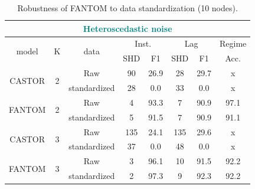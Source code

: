 \begin{table}[H]
\centering
\caption{Robustness of FANTOM to data standardization (10 nodes). }
\begin{tabular}{@{}cccccccc@{}}
\toprule
\multicolumn{8}{c}{\textcolor{teal}{Heteroscedastic noise}}                                                                                                                                                                       \\ \midrule
\multicolumn{1}{c|}{\multirow{2}{*}{model}} & \multicolumn{1}{c|}{\multirow{2}{*}{K}} & \multicolumn{1}{c|}{\multirow{2}{*}{data}} & \multicolumn{2}{c|}{Inst.}      & \multicolumn{2}{c}{Lag}         & Regime \\ \cmidrule(l){4-8} 
\multicolumn{1}{c|}{}                       & \multicolumn{1}{c|}{}                   & \multicolumn{1}{c|}{}                      & SHD & \multicolumn{1}{c|}{F1}   & SHD & \multicolumn{1}{c|}{F1}   & Acc.   \\ \midrule
\multicolumn{1}{c|}{\multirow{2}{*}{CASTOR}}                     & \multicolumn{1}{c|}{\multirow{2}{*}{2}} & \multicolumn{1}{c|}{Raw}                   & 90  & \multicolumn{1}{c|}{26.9} & 28  & \multicolumn{1}{c|}{29.7} & x      \\
                     \multicolumn{1}{c|}{}                        & \multicolumn{1}{c|}{}                   & \multicolumn{1}{c|}{standardized}          & 28  & \multicolumn{1}{c|}{0.0}  & 33  & \multicolumn{1}{c|}{0.0}  & x      \\
\multicolumn{1}{c|}{\multirow{2}{*}{FANTOM}}                     & \multicolumn{1}{c|}{\multirow{2}{*}{2}} & \multicolumn{1}{c|}{Raw}                   & 4   & \multicolumn{1}{c|}{93.3} & 7   & \multicolumn{1}{c|}{90.9} & 97.1   \\
                              \multicolumn{1}{c|}{}               & \multicolumn{1}{c|}{}                   & \multicolumn{1}{c|}{standardized}          & 5   & \multicolumn{1}{c|}{91.5} & 7   & \multicolumn{1}{c|}{90.9} & 91.1   \\ \midrule
\multicolumn{1}{c|}{\multirow{2}{*}{CASTOR}}                     & \multicolumn{1}{c|}{\multirow{2}{*}{3}} & \multicolumn{1}{c|}{Raw}                   & 135 & \multicolumn{1}{c|}{24.1} & 135 & \multicolumn{1}{c|}{29.6} & x      \\
                                 \multicolumn{1}{c|}{}            & \multicolumn{1}{c|}{}                   & \multicolumn{1}{c|}{standardized}          & 37  & \multicolumn{1}{c|}{0.0}  & 48  & \multicolumn{1}{c|}{0.0}  & x      \\
\multicolumn{1}{c|}{\multirow{2}{*}{FANTOM}}                    & \multicolumn{1}{c|}{\multirow{2}{*}{3}} & \multicolumn{1}{c|}{Raw}                   & 3   & \multicolumn{1}{c|}{96.1} & 10  & \multicolumn{1}{c|}{91.5} & 92.2   \\
                              \multicolumn{1}{c|}{}               & \multicolumn{1}{c|}{}                   & \multicolumn{1}{c|}{standardized}          & 2   & \multicolumn{1}{c|}{97.3} & 9   & \multicolumn{1}{c|}{92.3} & 92.2   \\ \bottomrule
\end{tabular}
\label{data_std_exp}
\end{table}

